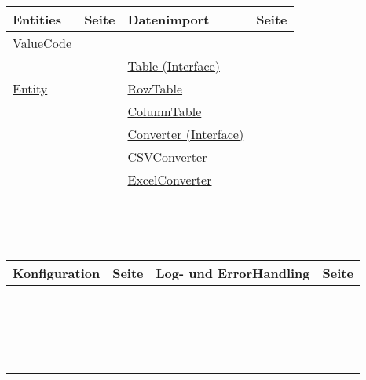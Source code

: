 \vspace{-0.5cm}
\begin{table}[!h]
\begin{tabular}{p{5cm} c | p{5cm} c}
Entities & Seite & Datenimport & Seite\\
\hline
\hyperref[valCode]{ValueCode} & \pageref{valCode} &\nameref{uploadHandler} & \pageref{uploadHandler}\\
\nameref{prop} & \pageref{prop} &\hyperref[Table]{Table (Interface)} & \pageref{Table}\\
\hyperref[ent]{Entity} & \pageref{ent} &\hyperref[rowtable]{RowTable} & \pageref{rowtable}\\
\nameref{thing} & \pageref{thing} &\hyperref[colTable]{ColumnTable} & \pageref{colTable}\\
\nameref{data} & \pageref{data} &\hyperref[conv]{Converter (Interface)} & \pageref{conv}\\
\nameref{loc} & \pageref{loc} &\hyperref[csvConv]{CSVConverter} & \pageref{csvConv}\\
\nameref{sensor} & \pageref{sensor} &\hyperref[excelConv]{ExcelConverter} & \pageref{excelConv}\\
\nameref{oprop} & \pageref{oprop} &\nameref{obsCreator} & \pageref{obsCreator}\\
\nameref{uom} & \pageref{uom} &\nameref{dupl} & \pageref{dupl}\\
\ & \ &\nameref{timeParser} & \pageref{timeParser}\\
\ & \ &\nameref{tableParser} & \pageref{tableParser}
\end{tabular}
\end{table}

\vspace{-0.5cm}
\begin{table}[!h]
\begin{tabular}{p{5cm} c | p{5cm} c}
Konfiguration & Seite & Log- und ErrorHandling & Seite\\
\hline
\nameref{strCol} & \pageref{strCol} & \nameref{srow} & \pageref{srow}\\
\nameref{strObs} & \pageref{strObs} & \nameref{error} & \pageref{error}\\
\nameref{zoneCol} & \pageref{zoneCol} & \nameref{log} & \pageref{log}\\
\nameref{config} & \pageref{config} & \nameref{fileman} & \pageref{fileman}\\
\nameref{magic} & \pageref{magic} & \ & \ \\
\nameref{magicMap} & \pageref{magicMap} & \ & \ \\
\nameref{confman} & \pageref{confman} & \ & \ \\

\end{tabular}
\end{table}

